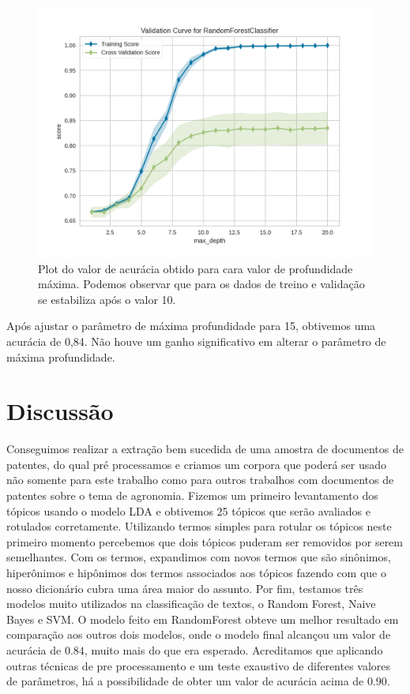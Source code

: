 \begin{figure}[ht!]
	\centering
	\includegraphics[scale=0.8]{imagens/validation_curve_max_depth_rf.png}
	\caption{Plot do valor de acurácia obtido para cara valor de profundidade máxima. Podemos observar que para os dados de treino e validação se estabiliza após o valor 10.
			 \label{validation_curve_max_depth_rf}}
\end{figure}

Após ajustar o parâmetro de máxima profundidade para 15, obtivemos uma acurácia de 0,84. Não houve um ganho significativo em alterar o parâmetro de máxima profundidade.

\section{Discussão}

Conseguimos realizar a extração bem sucedida de uma amostra de documentos de patentes, do qual pré processamos e criamos um corpora que poderá ser usado não somente para este trabalho como para outros trabalhos com documentos de patentes sobre o tema de agronomia. Fizemos um primeiro levantamento dos tópicos usando o modelo LDA e obtivemos 25 tópicos que serão avaliados e rotulados corretamente. 
Utilizando termos simples para rotular os tópicos neste primeiro momento percebemos que dois tópicos puderam ser removidos por serem semelhantes. Com os termos, expandimos com novos termos que são sinônimos, hiperônimos e hipônimos dos termos associados aos tópicos fazendo com que o nosso dicionário cubra uma área maior do assunto. 
Por fim, testamos três modelos muito utilizados na classificação de textos, o Random Forest, Naive Bayes e SVM. O modelo feito em RandomForest obteve um melhor resultado em comparação aos outros dois modelos, onde o modelo final  alcançou um valor de acurácia de $0.84$, muito mais do que era esperado. 
Acreditamos que aplicando outras técnicas de pre processamento e um teste exaustivo de diferentes valores de parâmetros, há a possibilidade de obter um valor de acurácia acima de $0.90$.

